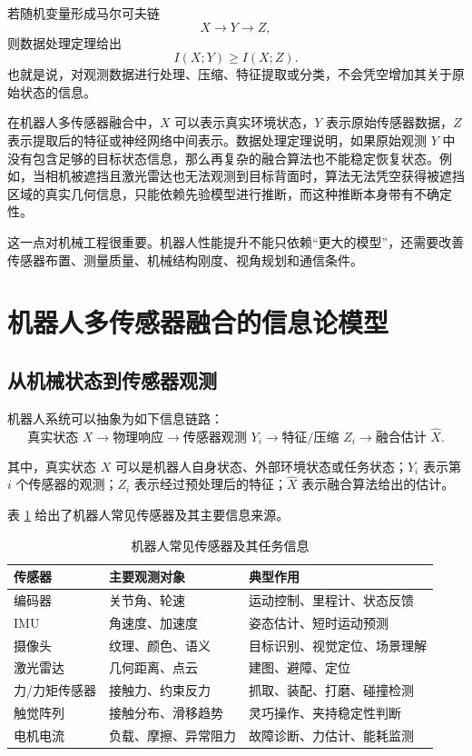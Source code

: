 \documentclass[UTF8,a4paper,12pt]{ctexart}
\begin{document}
若随机变量形成马尔可夫链
\begin{equation}
X \rightarrow Y \rightarrow Z,
\end{equation}
则数据处理定理给出
\begin{equation}
I(X;Y)\ge I(X;Z).
\end{equation}
也就是说，对观测数据进行处理、压缩、特征提取或分类，不会凭空增加其关于原始状态的信息。

在机器人多传感器融合中，$X$ 可以表示真实环境状态，$Y$ 表示原始传感器数据，$Z$ 表示提取后的特征或神经网络中间表示。数据处理定理说明，如果原始观测 $Y$ 中没有包含足够的目标状态信息，那么再复杂的融合算法也不能稳定恢复状态。例如，当相机被遮挡且激光雷达也无法观测到目标背面时，算法无法凭空获得被遮挡区域的真实几何信息，只能依赖先验模型进行推断，而这种推断本身带有不确定性。

这一点对机械工程很重要。机器人性能提升不能只依赖“更大的模型”，还需要改善传感器布置、测量质量、机械结构刚度、视角规划和通信条件。

\section{机器人多传感器融合的信息论模型}

\subsection{从机械状态到传感器观测}

机器人系统可以抽象为如下信息链路：
\[
\text{真实状态 }X
\rightarrow \text{物理响应}
\rightarrow \text{传感器观测 }Y_i
\rightarrow \text{特征/压缩 }Z_i
\rightarrow \text{融合估计 }\hat X.
\]

其中，真实状态 $X$ 可以是机器人自身状态、外部环境状态或任务状态；$Y_i$ 表示第 $i$ 个传感器的观测；$Z_i$ 表示经过预处理后的特征；$\hat X$ 表示融合算法给出的估计。

表 \ref{tab:sensors} 给出了机器人常见传感器及其主要信息来源。

\begin{table}[htbp]
\centering
\caption{机器人常见传感器及其任务信息}
\label{tab:sensors}
\begin{tabular}{lll}
\toprule
传感器 & 主要观测对象 & 典型作用 \\
\midrule
编码器 & 关节角、轮速 & 运动控制、里程计、状态反馈 \\
IMU & 角速度、加速度 & 姿态估计、短时运动预测 \\
摄像头 & 纹理、颜色、语义 & 目标识别、视觉定位、场景理解 \\
激光雷达 & 几何距离、点云 & 建图、避障、定位 \\
力/力矩传感器 & 接触力、约束反力 & 抓取、装配、打磨、碰撞检测 \\
触觉阵列 & 接触分布、滑移趋势 & 灵巧操作、夹持稳定性判断 \\
电机电流 & 负载、摩擦、异常阻力 & 故障诊断、力估计、能耗监测 \\
\bottomrule
\end{tabular}
\end{table}
\end{document}
